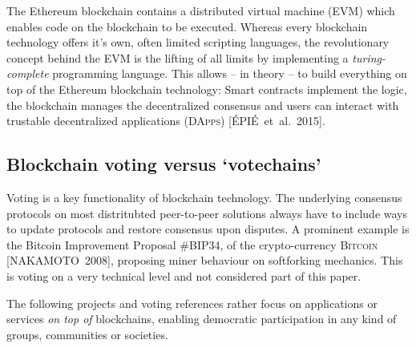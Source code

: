 \documentclass[9pt,oneside]{amsart}
\begin{document}
\begin{multicols}{2}
The Ethereum blockchain contains a distributed virtual machine (\textsc{EVM}) which enables code on the blockchain to be executed. Whereas every blockchain technology offers it's own, often limited scripting languages, the revolutionary concept behind the EVM is the lifting of all limits by implementing a \textit{turing-complete} programming language. This allows -- in theory -- to build everything on top of the Ethereum blockchain technology: Smart contracts implement the logic, the blockchain manages the decentralized consensus and users can interact with trustable decentralized applications (\textsc{DApps}) [ÉPIÉ~et~al.~2015].

\subsection{Blockchain voting versus \enquote*{votechains}}
Voting is a key functionality of blockchain technology. The underlying consensus protocols on most distritubted peer-to-peer solutions always have to include ways to update protocols and restore consensus upon disputes. A prominent example is the Bitcoin Improvement Proposal \#BIP34, of the crypto-currency \textsc{Bitcoin} [NAKAMOTO~2008], proposing miner behaviour on softforking mechanics. This is voting on a very technical level and not considered part of this paper.\par
The following projects and voting references rather focus on applications or services \textit{on top of} blockchains, enabling democratic participation in any kind of groups, communities or societies.


\end{multicols}
\end{document}
